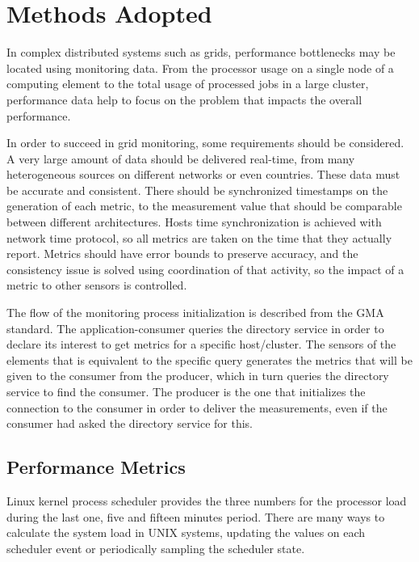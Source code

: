

\section{Methods Adopted}

In complex distributed systems such as grids, performance bottlenecks may be located using monitoring data. From the processor usage on a single node of a computing element to the total usage of processed jobs in a large cluster, performance data help to focus on the problem that impacts the overall performance.

In order to succeed in grid monitoring, some requirements should be considered. A very large amount of data should be delivered real-time, from many heterogeneous sources on different networks or even countries. These data must be accurate and consistent. There should be synchronized timestamps on the generation of each metric, to the measurement value that should be comparable between different architectures. Hosts time synchronization is achieved with network time protocol, so all metrics are taken on the time that they actually report. Metrics should have error bounds to preserve accuracy, and the consistency issue is solved using coordination of that activity, so the impact of a metric to other sensors is controlled.

The flow of the monitoring process initialization is described from the GMA standard. The application-consumer queries the directory service in order to declare its interest to get metrics for a specific host/cluster. The sensors of the elements that is equivalent to the specific query generates the metrics that will be given to the consumer from the producer, which in turn queries the directory service to find the consumer. The producer is the one that initializes the connection to the consumer in order to deliver the measurements, even if the consumer had asked the directory service for this. \cite{balatonuse}


\subsection{Performance Metrics}

Linux kernel process scheduler provides the three numbers for the processor load during the last one, five and fifteen minutes period. There are many ways to calculate the system load in UNIX systems, updating the values on each scheduler event or periodically sampling the scheduler state.


